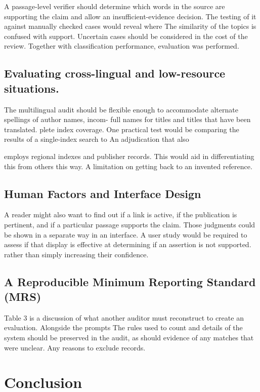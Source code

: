 \documentclass[acmsmall,screen,nonacm]{acmart}
\begin{document}
A passage-level verifier should determine which words in the source are supporting the claim and allow an insufficient-evidence decision. The testing of it against manually checked cases would reveal where The similarity of the topics is confused with support. Uncertain cases should be considered in the cost of the review. Together with classification performance, evaluation was performed.

\subsection{Evaluating cross-lingual and low-resource situations.}

The multilingual audit should be flexible enough to accommodate alternate spellings of author names, incom- full names for titles and titles that have been translated. plete index coverage. One practical test would be comparing the results of a single-index search to An adjudication that also

employs regional indexes and publisher records. This would aid in differentiating this from others this way. A limitation on getting back to an invented reference.

\subsection{Human Factors and Interface Design}

A reader might also want to find out if a link is active, if the publication is pertinent, and if a particular passage supports the claim. Those judgments could be shown in a separate way in an interface. A user study would be required to assess if that display is effective at determining if an assertion is not supported. rather than simply increasing their confidence.

\subsection{A Reproducible Minimum Reporting Standard (MRS)}

Table 3 is a discussion of what another auditor must reconstruct to create an evaluation. Alongside the prompts The rules used to count and details of the system should be preserved in the audit, as should evidence of any matches that were unclear. Any reasons to exclude records.

\section{Conclusion}
\end{document}
